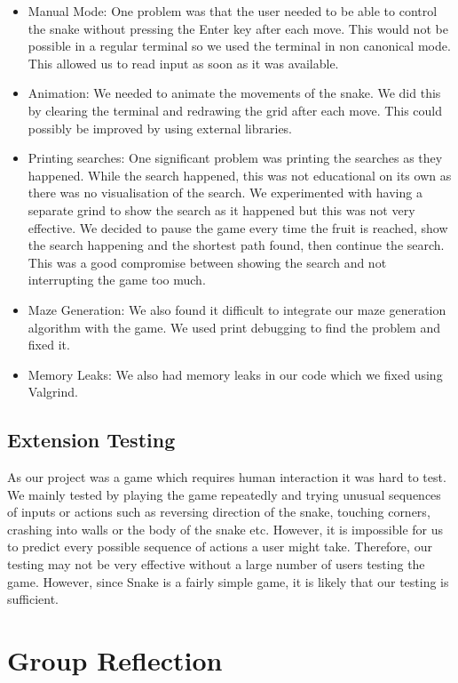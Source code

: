 \documentclass[11pt]{article}
\begin{document}
\begin{itemize}
    \item Manual Mode: One problem was that the user needed to be able to control the snake without pressing the Enter key after each move. This would not be possible in a regular terminal 
    so we used the terminal in non canonical mode. This allowed us to read input as soon as it was available.
    \item Animation: We needed to animate the movements of the snake. We did this by clearing the terminal and redrawing the grid after each move. This could possibly be improved by using external libraries.
    \item Printing searches: One significant problem was printing the searches as they happened. While the search happened, this was not educational on its own as there was no 
    visualisation of the search. We experimented with having a separate grind to show the search as it happened but this was not very effective. We decided to pause the game every time the fruit is reached, 
    show the search happening and the shortest path found, then continue the search. This was a good compromise between showing the search and not interrupting the game too much.
    \item Maze Generation: We also found it difficult to integrate our maze generation algorithm with the game. We used print debugging to find the problem and fixed it.
    \item Memory Leaks: We also had memory leaks in our code which we fixed using Valgrind.
\end{itemize}

\subsection{Extension Testing}
As our project was a game which requires human interaction it was hard to test. We mainly tested by playing the game repeatedly and trying unusual sequences of inputs or actions such as reversing direction of the snake, 
touching corners, crashing into walls or the body of the snake etc. However, it is impossible for us to predict every possible sequence of actions a user might take. Therefore, our testing may not be very effective without 
a large number of users testing the game. However, since Snake is a fairly simple game, it is likely that our testing is sufficient.

\section{Group Reflection}
\end{document}
